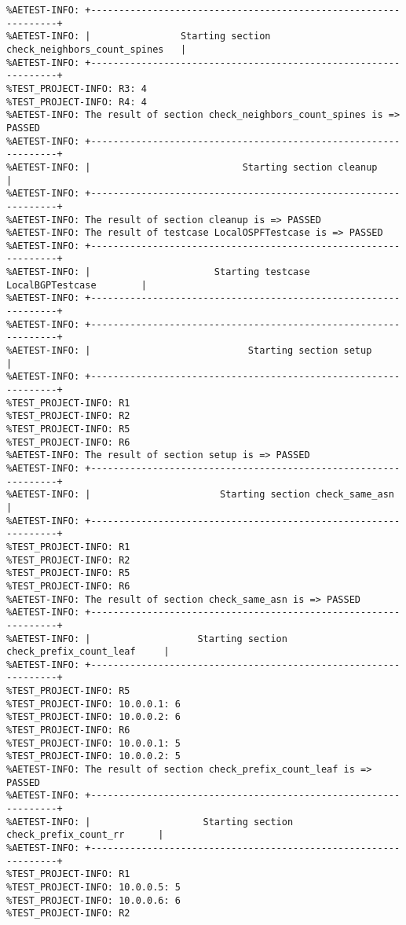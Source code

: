 \begin{verbatim}
%AETEST-INFO: +----------------------------------------------------------------+
%AETEST-INFO: |                Starting section check_neighbors_count_spines   |
%AETEST-INFO: +----------------------------------------------------------------+
%TEST_PROJECT-INFO: R3: 4
%TEST_PROJECT-INFO: R4: 4
%AETEST-INFO: The result of section check_neighbors_count_spines is => PASSED
%AETEST-INFO: +----------------------------------------------------------------+
%AETEST-INFO: |                           Starting section cleanup             |
%AETEST-INFO: +----------------------------------------------------------------+
%AETEST-INFO: The result of section cleanup is => PASSED
%AETEST-INFO: The result of testcase LocalOSPFTestcase is => PASSED
%AETEST-INFO: +----------------------------------------------------------------+
%AETEST-INFO: |                      Starting testcase LocalBGPTestcase        |
%AETEST-INFO: +----------------------------------------------------------------+
%AETEST-INFO: +----------------------------------------------------------------+
%AETEST-INFO: |                            Starting section setup              |
%AETEST-INFO: +----------------------------------------------------------------+
%TEST_PROJECT-INFO: R1
%TEST_PROJECT-INFO: R2
%TEST_PROJECT-INFO: R5
%TEST_PROJECT-INFO: R6
%AETEST-INFO: The result of section setup is => PASSED
%AETEST-INFO: +----------------------------------------------------------------+
%AETEST-INFO: |                       Starting section check_same_asn          |
%AETEST-INFO: +----------------------------------------------------------------+
%TEST_PROJECT-INFO: R1
%TEST_PROJECT-INFO: R2
%TEST_PROJECT-INFO: R5
%TEST_PROJECT-INFO: R6
%AETEST-INFO: The result of section check_same_asn is => PASSED
%AETEST-INFO: +----------------------------------------------------------------+
%AETEST-INFO: |                   Starting section check_prefix_count_leaf     |
%AETEST-INFO: +----------------------------------------------------------------+
%TEST_PROJECT-INFO: R5
%TEST_PROJECT-INFO: 10.0.0.1: 6
%TEST_PROJECT-INFO: 10.0.0.2: 6
%TEST_PROJECT-INFO: R6
%TEST_PROJECT-INFO: 10.0.0.1: 5
%TEST_PROJECT-INFO: 10.0.0.2: 5
%AETEST-INFO: The result of section check_prefix_count_leaf is => PASSED
%AETEST-INFO: +----------------------------------------------------------------+
%AETEST-INFO: |                    Starting section check_prefix_count_rr      |
%AETEST-INFO: +----------------------------------------------------------------+
%TEST_PROJECT-INFO: R1
%TEST_PROJECT-INFO: 10.0.0.5: 5
%TEST_PROJECT-INFO: 10.0.0.6: 6
%TEST_PROJECT-INFO: R2

\end{verbatim}

